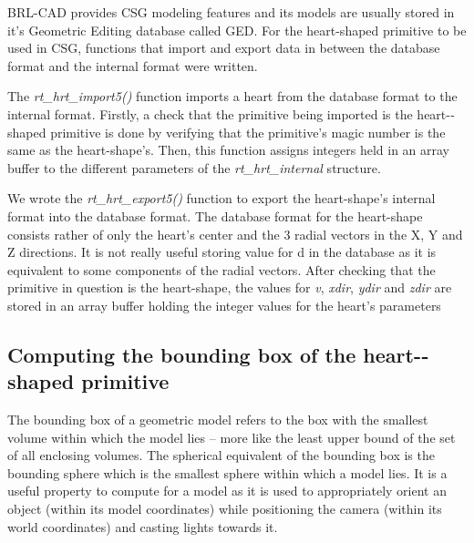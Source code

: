\hspace{30} BRL-­CAD   provides   CSG   modeling   features   and   its   models   are   usually  
stored   in   it's   Geometric   Editing   database   called   GED.   For   the   heart-­shaped  
primitive   to   be   used   in   CSG, functions that import and export data in between 
the database format and the internal format were written. 
  
The   \textit{rt\_hrt\_import5()}   function   imports   a   heart   from   the   database   format   to   the  
internal   format.   Firstly,  a check   that   the   primitive   being   imported   is   the  
heart-­shaped   primitive is done  by   verifying   that   the   primitive's   magic   number   is   the  
same   as   the   heart­-shape's.   Then,   this   function   assigns   integers   held   in   an   array  
buffer to the different parameters of the \textit{rt\_hrt\_internal} structure.
   
We   wrote   the   \textit{rt\_hrt\_export5()}   function   to   export   the   heart-­shape's   internal  
format   into   the   database   format.   The   database   format   for   the   heart­-shape  
consists   rather   of   only   the   heart's   center   and   the   3   radial   vectors   in   the   X,   Y   and  
Z   directions.   It   is   not   really   useful   storing   value   for   d   in   the   database   as   it   is  
equivalent   to   some   components   of   the   radial   vectors.   After   checking   that   the  
primitive   in   question   is   the   heart-shape, the   values   for   \textit{v},   \textit{xdir},   \textit{ydir}   and   \textit{zdir} are stored in an array buffer holding the integer values for the heart's parameters

\subsection{Computing the bounding box of the heart-­shaped primitive}

The   bounding   box   of   a   geometric   model   refers   to   the   box   with   the  
smallest   volume   within   which   the   model   lies   –   more   like   the   least   upper   bound  
of   the   set   of   all   enclosing   volumes.   The   spherical   equivalent   of   the   bounding  
box   is   the   bounding   sphere   which   is   the   smallest   sphere   within   which   a   model  
lies.   It   is   a   useful   property   to   compute   for   a   model   as   it   is   used   to   appropriately  
orient   an   object   (within   its   model   coordinates)   while   positioning   the   camera  
(within its world coordinates) and casting lights towards it.   

